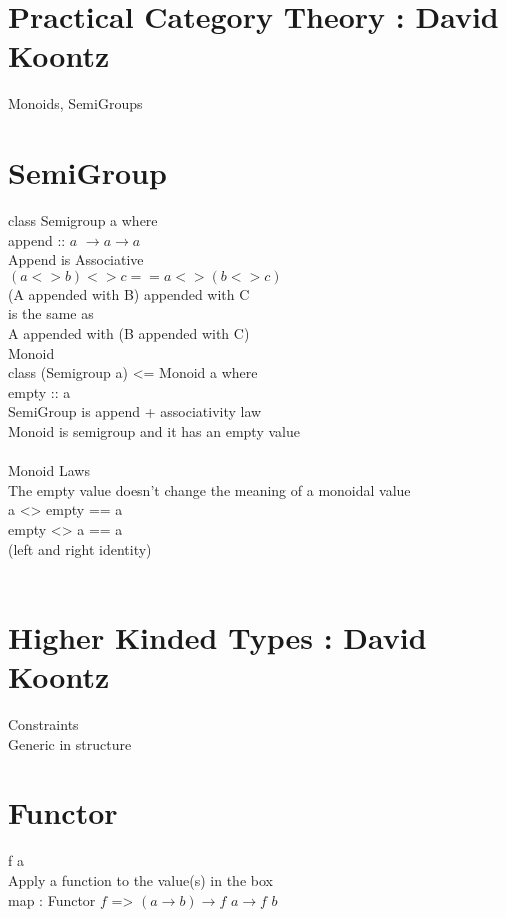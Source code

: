 \documentclass{article}
\begin{document}
\section{Practical Category Theory : David Koontz}
Monoids, SemiGroups
\\
\section{SemiGroup}
class Semigroup a where
\\
append :: $a$ $\rightarrow a \rightarrow a$
\\
Append is Associative
\\
$(a <> b) <> c == a <> (b <> c)$
\\
(A appended with B) appended with C 
\\
is the same as 
\\
A appended with (B appended with C)
\\
Monoid
\\
class (Semigroup a) <= Monoid a where 
\\
empty :: a 
\\
SemiGroup is append + associativity law
\\
Monoid is semigroup and it has an empty value
\\
\\
Monoid Laws
\\
The empty value doesn't change the meaning of a monoidal value
\\
a <> empty == a
\\
empty <> a == a
\\
(left and right identity)
\\
\\
\section{Higher Kinded Types : David Koontz}
Constraints
\\
Generic in structure
\\
\section{Functor}
f a
\\
Apply a function to the value(s) in the box
\\
map : Functor $f$ => $(a \rightarrow b) \rightarrow f$ $ a \rightarrow f$ $b$
\\
\end{document}
